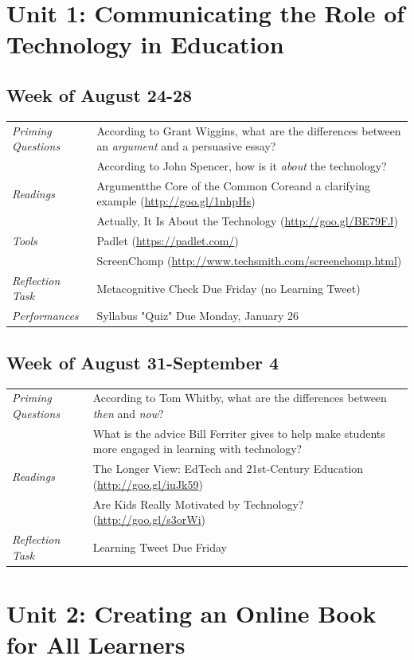 \documentclass{tufte-handout}
\newcommand{\tabpq}{\faQuestionCircle\medspace\textit{Priming Questions}}
\newcommand{\tabread}{\faBook\medspace\textit{Readings}}
\newcommand{\tabperformance}{\faTasks\medspace\textit{Performances}}
\newcommand{\tabtools}{\faWrench\medspace\textit{Tools}}
\newcommand{\tabtweet}{\faLightbulbO\medspace\textit{Reflection Task} & Learning Tweet Due Friday \\}
\newcommand{\tabcheck}{\faLightbulbO\medspace\textit{Reflection Task} & Metacognitive Check Due Friday (no Learning Tweet) \\}
\newenvironment{tabsched}
	{\small
	\begin{tabular}{p{1.5in}p{4.5in}}
	\toprule}
	{\bottomrule
	\end{tabular}
	\normalsize}
\newcommand{\weektwo}{August 24-28}
\newcommand{\weekthree}{August 31-September 4}
\begin{document}
\section{Unit 1: Communicating the Role of Technology in Education}

\subsection{Week of \weektwo}

\begin{tabsched}
	\tabpq & According to Grant Wiggins, what are the differences between an \emph{argument} and a persuasive essay? \\
	& According to John Spencer, how is it \emph{about} the technology? \\
	\midrule
	\tabread & Argument\textemdash{}the Core of the Common Core\textemdash{}and a clarifying example (\url{http://goo.gl/1nhpHs}) \\
	& Actually, It Is About the Technology (\url{http://goo.gl/BE79FJ}) \\
	\midrule
	\tabtools & Padlet (\url{https://padlet.com/}) \\
	& ScreenChomp (\url{http://www.techsmith.com/screenchomp.html}) \\
	\midrule
	\tabcheck
	\midrule
	\tabperformance & Syllabus "Quiz" Due Monday, January 26 \\
\end{tabsched}

\subsection{Week of \weekthree}

\begin{tabsched}
	\tabpq & According to Tom Whitby, what are the differences between \textit{then} and \textit{now}? \\
	& What is the advice Bill Ferriter gives to help make students more engaged in learning with technology? \\
	\midrule
	\tabread & The Longer View: EdTech and 21st-Century Education (\url{http://goo.gl/iuJk59}) \\
	& Are Kids Really Motivated by Technology? (\url{http://goo.gl/s3orWi}) \\
	\midrule
	\tabtweet
\end{tabsched}

\section{Unit 2: Creating an Online Book for All Learners}
\end{document}
